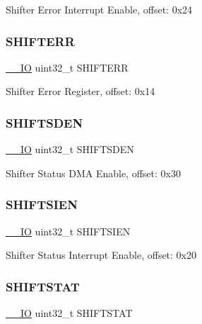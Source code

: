 Shifter Error Interrupt Enable, offset\+: 0x24 \mbox{\label{struct_f_l_e_x_i_o___type_ad347c3a79fc856a6b4a44a448f9e3a0c}} 
\subsubsection{\texorpdfstring{SHIFTERR}{SHIFTERR}}
{\footnotesize\ttfamily \mbox{\hyperlink{core__cm0plus_8h_aec43007d9998a0a0e01faede4133d6be}{\+\_\+\+\_\+\+IO}} uint32\+\_\+t S\+H\+I\+F\+T\+E\+RR}

Shifter Error Register, offset\+: 0x14 \mbox{\label{struct_f_l_e_x_i_o___type_a9f165d8b54aa90099eb9eeb4bb86ba1d}} 
\subsubsection{\texorpdfstring{SHIFTSDEN}{SHIFTSDEN}}
{\footnotesize\ttfamily \mbox{\hyperlink{core__cm0plus_8h_aec43007d9998a0a0e01faede4133d6be}{\+\_\+\+\_\+\+IO}} uint32\+\_\+t S\+H\+I\+F\+T\+S\+D\+EN}

Shifter Status D\+MA Enable, offset\+: 0x30 \mbox{\label{struct_f_l_e_x_i_o___type_aa235af9b0cbab8f28b3af6ba1d05fa08}} 
\subsubsection{\texorpdfstring{SHIFTSIEN}{SHIFTSIEN}}
{\footnotesize\ttfamily \mbox{\hyperlink{core__cm0plus_8h_aec43007d9998a0a0e01faede4133d6be}{\+\_\+\+\_\+\+IO}} uint32\+\_\+t S\+H\+I\+F\+T\+S\+I\+EN}

Shifter Status Interrupt Enable, offset\+: 0x20 \mbox{\label{struct_f_l_e_x_i_o___type_a3d40c2ada5f832e7800b30feeaf8a8db}} 
\subsubsection{\texorpdfstring{SHIFTSTAT}{SHIFTSTAT}}
{\footnotesize\ttfamily \mbox{\hyperlink{core__cm0plus_8h_aec43007d9998a0a0e01faede4133d6be}{\+\_\+\+\_\+\+IO}} uint32\+\_\+t S\+H\+I\+F\+T\+S\+T\+AT}

